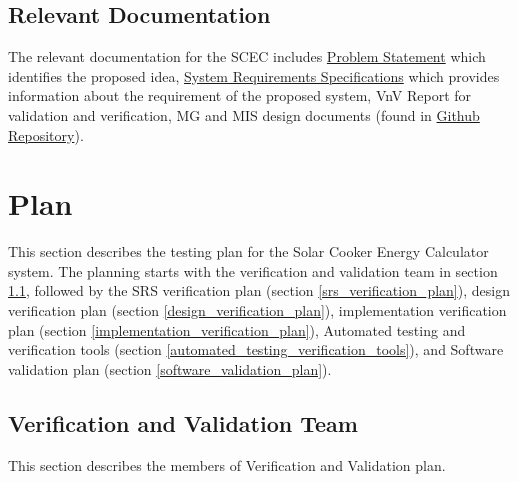 \documentclass[12pt, titlepage]{article}
\begin{document}
\subsection{Relevant Documentation}

The relevant documentation for the SCEC includes \href{https://github.com/DeeshaPatel/CAS-741-Solar-Cooker/blob/7c53c8d9a19ca2f94dfba6ba9208eae0bf03b8cc/docs/ProblemStatementAndGoals/ProblemStatement.pdf}{Problem Statement} which identifies the proposed idea, \href{https://github.com/DeeshaPatel/CAS-741-Solar-Cooker/blob/7c53c8d9a19ca2f94dfba6ba9208eae0bf03b8cc/docs/SRS/SRS.pdf}{System Requirements Specifications} which provides information about the requirement of the proposed system, VnV Report for validation and verification, MG and MIS design documents (found in \href{https://github.com/DeeshaPatel/CAS-741-Solar-Cooker/tree/main/docs}{Github Repository}).  


\section{Plan}
\label{plan}

This section describes the testing plan for the Solar Cooker Energy Calculator system. The planning starts with the verification and validation team in section \ref{verification_validation_team}, followed by the SRS verification plan (section \ref{srs_verification_plan}), design verification plan (section \ref{design_verification_plan}), implementation verification plan (section \ref{implementation_verification_plan}), Automated testing and verification tools (section \ref{automated_testing_verification_tools}), and Software validation plan (section \ref{software_validation_plan}).  

\subsection{Verification and Validation Team}
\label{verification_validation_team}

This section describes the members of Verification and Validation plan. 
\end{document}
